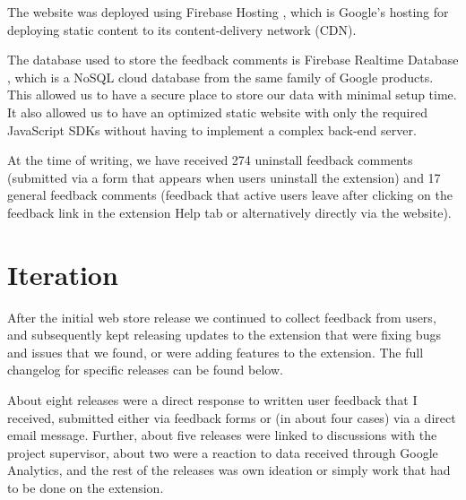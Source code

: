 \documentclass[bsc,frontabs,twoside,singlespacing,parskip,deptreport]{infthesis}
\begin{document}
The website was deployed using Firebase Hosting \cite{A8}, which is Google's hosting for deploying static content to its content-delivery network (CDN).

The database used to store the feedback comments is Firebase Realtime Database \cite{A9}, which is a NoSQL cloud database from the same family of Google products. This allowed us to have a secure place to store our data with minimal setup time. It also allowed us to have an optimized static website with only the required JavaScript SDKs without having to implement a complex back-end server.

At the time of writing, we have received 274 uninstall feedback comments (submitted via a form that appears when users uninstall the extension) and 17 general feedback comments (feedback that active users leave after clicking on the feedback link in the extension Help tab or alternatively directly via the website).

\section{Iteration}
After the initial web store release we continued to collect feedback from users, and subsequently kept releasing updates to the extension that were fixing bugs and issues that we found, or were adding features to the extension. The full changelog for specific releases can be found below.

About eight releases were a direct response to written user feedback that I received, submitted either via feedback forms or (in about four cases) via a direct email message. Further, about five releases were linked to discussions with the project supervisor, about two were a reaction to data received through Google Analytics, and the rest of the releases was own ideation or simply work that had to be done on the extension.
\end{document}
